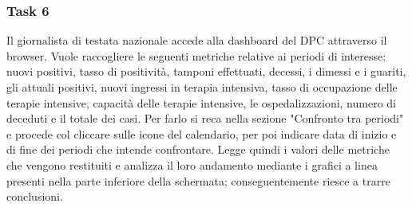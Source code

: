 \subsubsection{Task 6}
\label{sss:cw-task-6}

Il giornalista di testata nazionale accede alla dashboard del DPC attraverso il browser.
Vuole raccogliere le seguenti metriche relative ai periodi di interesse: nuovi positivi, tasso di positività, tamponi effettuati, decessi, i dimessi e i guariti, gli attuali positivi, nuovi ingressi in terapia intensiva, tasso di occupazione delle terapie intensive, capacità delle terapie intensive, le ospedalizzazioni,  numero di deceduti e il totale dei casi.
Per farlo si reca nella sezione "Confronto tra periodi" e procede col cliccare sulle icone del calendario, per poi indicare data di inizio e di fine dei periodi che intende confrontare.
Legge quindi i valori delle metriche che vengono restituiti e analizza il loro andamento mediante i grafici a linea presenti nella parte inferiore della schermata; conseguentemente riesce a trarre conclusioni. 